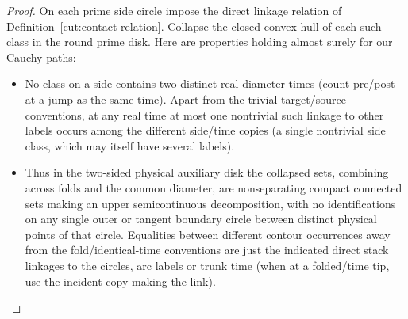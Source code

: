 \begin{proof}
On each prime side circle impose the direct linkage relation of Definition~\ref{cut:contact-relation}. Collapse the closed convex hull of each such class in the round prime disk. Here are properties holding almost surely for our Cauchy paths:
\begin{itemize}
\item No class on a side contains two distinct real diameter times (count pre/post at a jump as the same time). Apart from the trivial target/source conventions, at any real time at most one nontrivial such linkage to other labels occurs among the different side/time copies (a single nontrivial side class, which may itself have several labels).
\item Thus in the two-sided physical auxiliary disk the collapsed sets, combining across folds and the common diameter, are nonseparating compact connected sets making an upper semicontinuous decomposition, with no identifications on any single outer or tangent boundary circle between distinct physical points of that circle.
Equalities between different contour occurrences away from the fold/identical-time conventions are just the indicated direct stack linkages to the circles, arc labels or trunk time (when at a folded/time tip, use the incident copy making the link).
\end{itemize}

\label{cut:range-polarity}


\end{proof}
